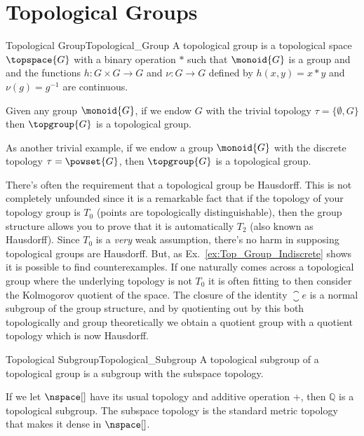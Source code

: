 \section{Topological Groups}
    \begin{fdefinition}{Topological Group}{Topological_Group}
        A topological group is a topological space $\topspace{G}$ with a
        binary operation $*$ such that $\monoid{G}$ is a group and and
        the functions $h:G\times{G}\rightarrow{G}$ and
        $\nu:G\rightarrow{G}$ defined by $h(x,y)=x*y$ and
        $\nu(g)=g^{\minus{1}}$ are continuous.
    \end{fdefinition}
    \begin{example}
        \label{ex:Top_Group_Indiscrete}%
        Given any group $\monoid{G}$, if we endow $G$ with the trivial
        topology $\tau=\{\emptyset,G\}$ then $\topgroup{G}$ is a
        topological group.
    \end{example}
    \begin{example}
        As another trivial example, if we endow a group $\monoid{G}$
        with the discrete topology $\tau=\powset{G}$, then
        $\topgroup{G}$ is a topological group. 
    \end{example}
    There's often the requirement that a topological group be Hausdorff.
    This is not completely unfounded since it is a remarkable fact that
    if the topology of your topology group is $T_{0}$ (points are
    topologically distinguishable), then the group structure allows you
    to prove that it is automatically $T_{2}$ (also known as Hausdorff).
    Since $T_{0}$ is a \textit{very} weak assumption, there's no harm in
    supposing topological groups are Hausdorff. But, as
    Ex.~\ref{ex:Top_Group_Indiscrete} shows it is possible to find
    counterexamples. If one naturally comes across a topological group
    where the underlying topology is not $T_{0}$ it is often fitting to
    then consider the Kolmogorov quotient of the space. The closure of
    the identity $\closure{e}$ is a normal subgroup of the group
    structure, and by quotienting out by this both topologically and
    group theoretically we obtain a quotient group with a quotient
    topology which is now Hausdorff.
    \begin{fdefinition}{Topological Subgroup}{Topological_Subgroup}
        A topological subgroup of a topological group is a subgroup with
        the subspace topology.
    \end{fdefinition}
    \begin{example}
        If we let $\nspace[]$ have its usual topology and additive
        operation $+$, then $\mathbb{Q}$ is a topological subgroup. The
        subspace topology is the standard metric topology that makes it
        dense in $\nspace[]$.
    \end{example}
